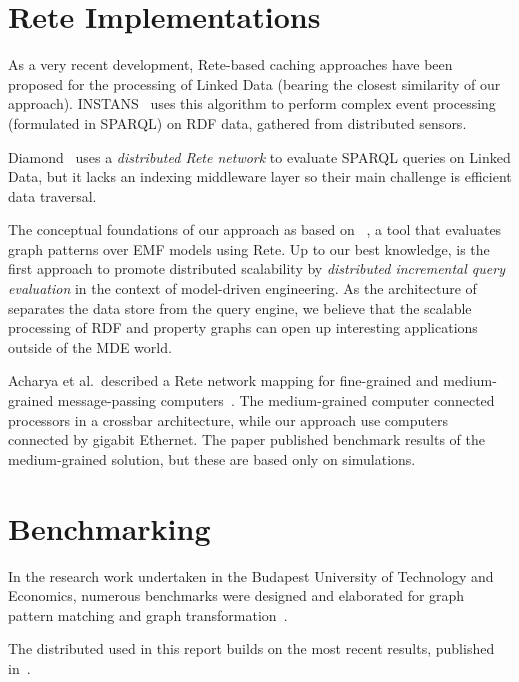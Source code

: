 \section{Rete Implementations}


As a very recent development, Rete-based caching approaches have been proposed for the processing of Linked Data (bearing the closest similarity of our approach). \mbox{INSTANS}~\cite{INSTANS2012} uses this algorithm to perform complex event processing (formulated in SPARQL) on RDF data, gathered from distributed sensors.

Diamond~\cite{miranker2012diamond} uses a \emph{distributed Rete network} to evaluate SPARQL queries on Linked Data, but it lacks an indexing middleware layer so their main challenge is efficient data traversal.

The conceptual foundations of our approach as based on \eiq{}~\cite{models10}, a tool that evaluates graph patterns over EMF models using Rete. Up to our best knowledge, \iqd{} is the first approach to promote distributed scalability by \emph{distributed incremental query evaluation} in the context of model-driven engineering. As the architecture of \iqd{} separates the data store from the query engine, we believe that the scalable processing of RDF and property graphs can open up interesting applications outside of the MDE world.

Acharya et al.\ described a Rete network mapping for fine-grained and medium-grained message-passing computers~\cite{message-passing-rete}. The medium-grained computer connected processors in a crossbar architecture, while our approach use computers connected by gigabit Ethernet. The paper published benchmark results of the medium-grained solution, but these are based only on simulations.

\section{Benchmarking}

In the research work undertaken in the Budapest University of Technology and Economics, numerous benchmarks were designed and elaborated for graph pattern matching and graph transformation~\cite{VSV05b, STTT10}.

The distributed \tb{} used in this report builds on the most recent results, published in~\cite{ASE2013}.

